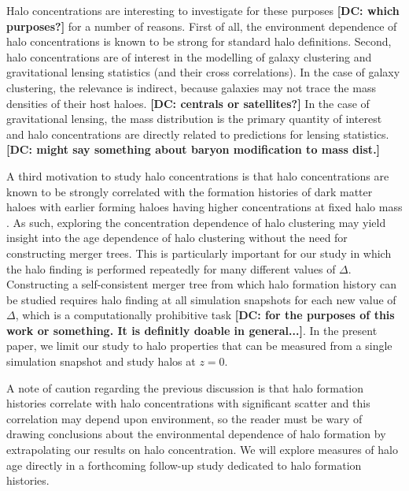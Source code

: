 \documentclass[usenatbib,fleqn]{mnras}
\begin{document}
Halo concentrations are interesting to investigate for these purposes {\bf [DC: which purposes?]} for a number of reasons. First of all, the environment dependence of halo concentrations is known to be strong for standard halo definitions. Second, halo concentrations are of interest in the modelling of galaxy clustering and gravitational lensing statistics (and their cross correlations). In the case of galaxy clustering, the relevance is indirect, because galaxies may not trace the mass densities of their host haloes. {\bf [DC: centrals or satellites?]} In the case of gravitational lensing, the mass distribution is the primary quantity of interest and halo concentrations are directly related to predictions for lensing statistics. {\bf [DC: might say something about baryon modification to mass dist.]}

A third motivation to study halo concentrations is that halo concentrations are known to be strongly correlated with the formation histories of dark matter haloes with earlier forming haloes having higher concentrations at fixed halo mass \citep{wechsler_etal02, zhao_etal03, wechsler_etal06, zhao_etal09}. As such, exploring the concentration dependence of halo clustering may yield insight into the age dependence of halo clustering without the need for constructing merger trees. This is particularly important for our study in which the halo finding is performed repeatedly for many different values of $\Delta$. Constructing a self-consistent merger tree from which halo formation history can be studied requires halo finding at all simulation snapshots for each new value of $\Delta$, which is a computationally prohibitive task {\bf [DC: for the purposes of this work or something.  It is definitly doable in general...]}. In the present paper, we limit our study to halo properties that can be measured from a single simulation snapshot and study halos at $z=0$. 

A note of caution regarding the previous discussion is that halo formation histories correlate with halo concentrations with significant scatter and this correlation may depend upon environment, so the reader must be wary of drawing conclusions about the environmental dependence of halo formation by extrapolating our results on halo concentration. We will explore measures of halo age directly in a forthcoming follow-up study dedicated to halo formation histories.
\end{document}
